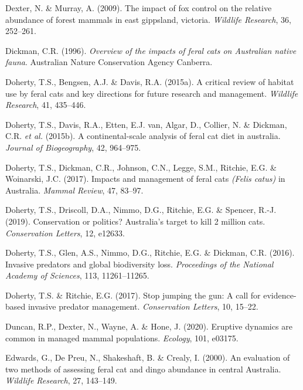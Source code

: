 \documentclass[11pt,a4paper,titlepage,twoside,openright]{style/unimelbthesis}
\begin{document}
\begin{mainmatter}
\leavevmode\hypertarget{ref-dexter2009impact}{}%
Dexter, N. \& Murray, A. (2009). The impact of fox control on the relative abundance of forest mammals in east gippsland, victoria. \emph{Wildlife Research}, 36, 252--261.

\leavevmode\hypertarget{ref-dickman1996overview}{}%
Dickman, C.R. (1996). \emph{Overview of the impacts of feral cats on Australian native fauna}. Australian Nature Conservation Agency Canberra.

\leavevmode\hypertarget{ref-doherty2015critical}{}%
Doherty, T.S., Bengsen, A.J. \& Davis, R.A. (2015a). A critical review of habitat use by feral cats and key directions for future research and management. \emph{Wildlife Research}, 41, 435--446.

\leavevmode\hypertarget{ref-doherty2015continental}{}%
Doherty, T.S., Davis, R.A., Etten, E.J. van, Algar, D., Collier, N. \& Dickman, C.R. \emph{et al.} (2015b). A continental-scale analysis of feral cat diet in australia. \emph{Journal of Biogeography}, 42, 964--975.

\leavevmode\hypertarget{ref-doherty2017impacts}{}%
Doherty, T.S., Dickman, C.R., Johnson, C.N., Legge, S.M., Ritchie, E.G. \& Woinarski, J.C. (2017). Impacts and management of feral cats \emph{(Felis catus)} in Australia. \emph{Mammal Review}, 47, 83--97.

\leavevmode\hypertarget{ref-doherty2019conservation}{}%
Doherty, T.S., Driscoll, D.A., Nimmo, D.G., Ritchie, E.G. \& Spencer, R.-J. (2019). Conservation or politics? Australia's target to kill 2 million cats. \emph{Conservation Letters}, 12, e12633.

\leavevmode\hypertarget{ref-doherty2016invasive}{}%
Doherty, T.S., Glen, A.S., Nimmo, D.G., Ritchie, E.G. \& Dickman, C.R. (2016). Invasive predators and global biodiversity loss. \emph{Proceedings of the National Academy of Sciences}, 113, 11261--11265.

\leavevmode\hypertarget{ref-doherty2017stop}{}%
Doherty, T.S. \& Ritchie, E.G. (2017). Stop jumping the gun: A call for evidence-based invasive predator management. \emph{Conservation Letters}, 10, 15--22.

\leavevmode\hypertarget{ref-duncan2020eruptive}{}%
Duncan, R.P., Dexter, N., Wayne, A. \& Hone, J. (2020). Eruptive dynamics are common in managed mammal populations. \emph{Ecology}, 101, e03175.

\leavevmode\hypertarget{ref-edwards2000evaluation}{}%
Edwards, G., De Preu, N., Shakeshaft, B. \& Crealy, I. (2000). An evaluation of two methods of assessing feral cat and dingo abundance in central Australia. \emph{Wildlife Research}, 27, 143--149.


\end{mainmatter}
\end{document}
